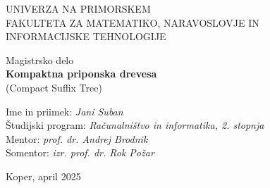 \documentclass[12pt,a4paper,titlepage,openany,twoside]{report}
\begin{document}
\pagestyle{empty}
\begin{center}
\noindent \large UNIVERZA NA PRIMORSKEM\\
\large FAKULTETA ZA MATEMATIKO, NARAVOSLOVJE IN\\
INFORMACIJSKE TEHNOLOGIJE


\normalsize
\vspace{6cm}
Magistrsko delo\\
\textbf{\large Kompaktna priponska drevesa}\\ %
\normalsize
(Compact Suffix Tree)\\ %
\end{center}

\begin{flushleft}
\vspace{5cm}
\noindent Ime in priimek: \textit{Jani Suban}
\\
\noindent Študijski program: \textit{Računalništvo in informatika, 2. stopnja}
\\
\noindent Mentor: \textit{prof. dr. Andrej Brodnik}
\\
\noindent Somentor: \textit{izr. prof. dr. Rok Požar}
\\

\end{flushleft}

\vspace{4cm}
\begin{center}
\large {Koper, april 2025} %
\end{center}
\newpage

\pagestyle{fancy}
\end{document}
